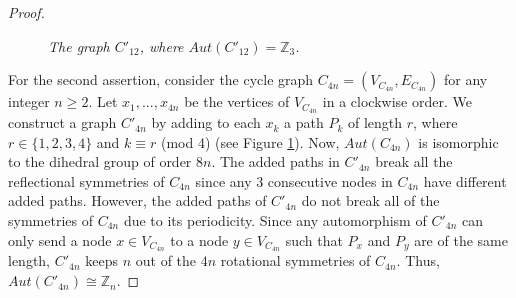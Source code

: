 \documentclass[12pt,reqno,a4paper]{amsart}
\theoremstyle{definition}
\begin{document}
\begin{proof}
\begin{figure}[!ht]
\begin{minipage}{\textwidth}
\end{minipage}
\caption{\em The graph $C'_{12}$, where $Aut(C'_{12})=\mathbb{Z}_{3}$.}
\label{Figure 4}
\end{figure}

For the second assertion, consider the cycle graph $C_{4n}=(V_{C_{4n}}, E_{C_{4n}})$ for any integer $n\geq 2$. Let $x_{1},...,x_{4n}$ be the vertices of $V_{C_{4n}}$ in a clockwise order.
We construct a graph ${C'_{4n}}$ by adding to each $x_k$ a path $P_{k}$ of length $r$, where $r \in \{1, 2, 3, 4\}$ and $k \equiv r$ (mod 4) (see Figure \ref{Figure 4}).
Now, $Aut(C_{4n})$ is isomorphic to the dihedral group of order $8n$. The added paths in ${C'_{4n}}$ break all the reflectional symmetries of $C_{4n}$ since any 3 consecutive nodes in $C_{4n}$ have different added paths. However, the added paths of ${C'_{4n}}$ do not break all of the symmetries of $C_{4n}$ due to its periodicity. Since any automorphism of ${C'_{4n}}$ can only send a node $x\in V_{C_{4n}}$ to a node $y\in V_{C_{4n}}$ such that $P_{x}$ and $P_{y}$ are of the same length, ${C'_{4n}}$ keeps $n$ out of the $4n$ rotational symmetries of $C_{4n}$. Thus, $Aut({C'_{4n}})\cong \mathbb{Z}_n$.
 

\end{proof}
\end{document}
